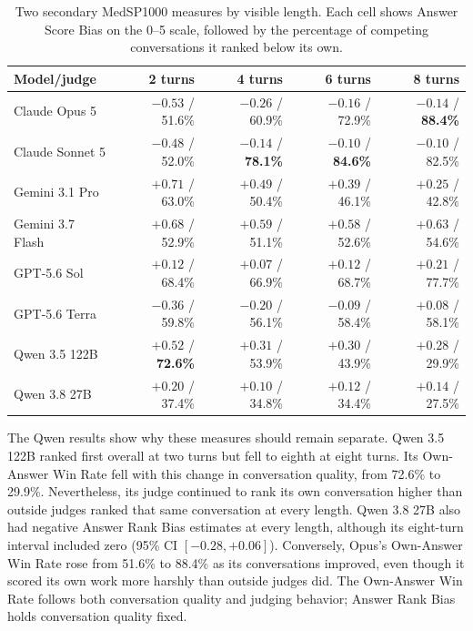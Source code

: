 \documentclass[11pt]{article}
\begin{document}
\begin{table}[htbp]
\centering
\scriptsize
\caption{Two secondary MedSP1000 measures by visible length. Each cell shows
Answer Score Bias on the 0--5 scale, followed by the percentage
of competing conversations it ranked below its own.}
\smallskip
\label{tab:med-draft-scores}
\begin{tabular}{lrrrr}
\toprule
Model/judge & 2 turns & 4 turns & 6 turns & 8 turns \\
\midrule
Claude Opus 5 & $-0.53$ / 51.6\% & $-0.26$ / 60.9\% & $-0.16$ / 72.9\% & $-0.14$ / \textbf{88.4\%} \\
Claude Sonnet 5 & $-0.48$ / 52.0\% & $-0.14$ / \textbf{78.1\%} & $-0.10$ / \textbf{84.6\%} & $-0.10$ / 82.5\% \\
Gemini 3.1 Pro & $\boldsymbol{+0.71}$ / 63.0\% & $+0.49$ / 50.4\% & $+0.39$ / 46.1\% & $+0.25$ / 42.8\% \\
Gemini 3.7 Flash & $+0.68$ / 52.9\% & $\boldsymbol{+0.59}$ / 51.1\% & $\boldsymbol{+0.58}$ / 52.6\% & $\boldsymbol{+0.63}$ / 54.6\% \\
GPT-5.6 Sol & $+0.12$ / 68.4\% & $+0.07$ / 66.9\% & $+0.12$ / 68.7\% & $+0.21$ / 77.7\% \\
GPT-5.6 Terra & $-0.36$ / 59.8\% & $-0.20$ / 56.1\% & $-0.09$ / 58.4\% & $+0.08$ / 58.1\% \\
Qwen 3.5 122B & $+0.52$ / \textbf{72.6\%} & $+0.31$ / 53.9\% & $+0.30$ / 43.9\% & $+0.28$ / 29.9\% \\
Qwen 3.8 27B & $+0.20$ / 37.4\% & $+0.10$ / 34.8\% & $+0.12$ / 34.4\% & $+0.14$ / 27.5\% \\
\bottomrule
\end{tabular}
\end{table}
\FloatBarrier


The Qwen results show why these measures should remain separate. Qwen 3.5 122B
ranked first overall at two turns but fell to eighth at eight turns. Its
Own-Answer Win Rate fell with this change in conversation quality, from 72.6\% to
29.9\%. Nevertheless, its judge continued to rank its own conversation higher
than outside judges ranked that same conversation at every length. Qwen 3.8
27B also had negative Answer Rank Bias estimates at every length, although its
eight-turn interval included zero (95\% CI $[-0.28,+0.06]$). Conversely,
Opus's Own-Answer Win Rate rose from 51.6\% to 88.4\% as its conversations improved,
even though it scored its own work more harshly than outside judges did. The
Own-Answer Win Rate follows both conversation quality and judging behavior;
Answer Rank Bias holds conversation quality fixed.
\end{document}
